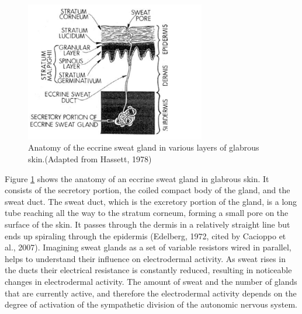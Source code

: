 \begin{figure}[ht]
\centering
\includegraphics[width=0.7\textwidth]{images/skinAnatomy.png}
\caption{Anatomy of the eccrine sweat gland in various layers of glabrous skin.(Adapted from Hassett, 1978)\citep{HANDBOOKPP}}
\label{layerImg}
\end{figure}

Figure \ref{layerImg} shows the anatomy of an eccrine sweat gland in glabrous skin. It consists of the  secretory portion, the coiled compact body of the gland, and the sweat duct. The sweat duct, which is the excretory portion of the gland, is a long tube reaching all the way to the stratum corneum, forming a small pore on the surface of the skin. It passes through the dermis in a relatively straight line but ends up spiraling through the epidermis (Edelberg, 1972, cited by Cacioppo et al., 2007). Imagining sweat glands as a set of variable resistors wired in parallel, helps to understand their influence on electrodermal activity. As sweat rises in the ducts their electrical resistance is constantly reduced, resulting in noticeable changes in electrodermal activity. The amount of sweat and the number of glands that are currently active, and therefore the electrodermal activity depends on the degree of activation of the sympathetic division of the autonomic nervous system.


